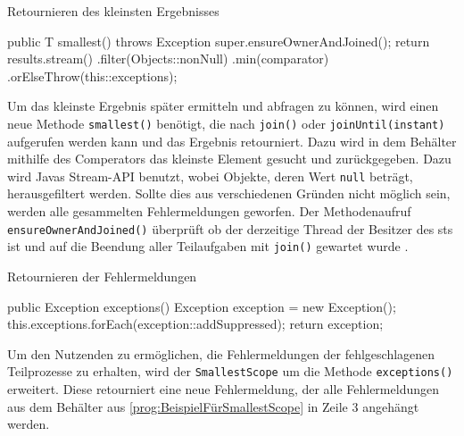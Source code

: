     \begin{program} [H]
        \caption{Retournieren des kleinsten Ergebnisses}
        \label{prog:ReturnierenDesKleinstenErgebnisses}
    \begin{JavaCode}[language=Java, numbers=left]
public T smallest() throws Exception {
    super.ensureOwnerAndJoined();
    return results.stream()
            .filter(Objects::nonNull)
            .min(comparator)
            .orElseThrow(this::exceptions);
}\end{JavaCode}
    \end{program}
    Um das kleinste Ergebnis später ermitteln und abfragen zu können, wird einen neue Methode \texttt{smallest()} benötigt, die nach \texttt{join()} oder
    \texttt{joinUntil(instant)} aufgerufen werden kann und das Ergebnis retourniert. Dazu wird in dem Behälter mithilfe des Comperators das kleinste Element gesucht
    und zurückgegeben. Dazu wird Javas Stream-API benutzt, wobei Objekte, deren Wert \texttt{null} beträgt, herausgefiltert werden. Sollte dies aus verschiedenen Gründen
    nicht möglich sein, werden alle gesammelten Fehlermeldungen geworfen. Der Methodenaufruf \texttt{ensureOwnerAndJoined()} überprüft ob der derzeitige Thread der Besitzer des \gls{sts} ist und auf die Beendung
    aller Teilaufgaben mit \texttt{join()} gewartet wurde \cite{oracle21STS}.
    \begin{program} [H]
        \caption{Retournieren der Fehlermeldungen}
        \label{prog:ReturnierenDerFehlermeldungen}
    \begin{JavaCode}[language=Java, numbers=left]
public Exception exceptions() {
    Exception exception = new Exception();
    this.exceptions.forEach(exception::addSuppressed);
    return exception;
}\end{JavaCode}
    \end{program}
    Um den Nutzenden zu ermöglichen, die Fehlermeldungen der fehlgeschlagenen Teilprozesse zu erhalten, wird der \texttt{SmallestScope} um die Methode \texttt{exceptions()} erweitert.
    Diese retourniert eine neue Fehlermeldung, der alle Fehlermeldungen aus dem Behälter aus \ref{prog:BeispielFürSmallestScope} in Zeile 3 angehängt werden.

